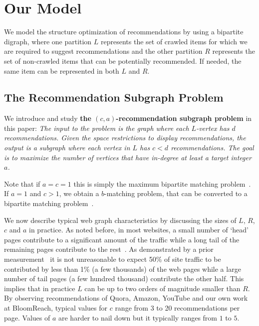\section{Our Model}

We model the structure optimization of recommendations by using a bipartite
digraph, where one partition $L$ represents the set of crawled items for which
we are required to suggest recommendations and the other partition $R$
represents the set of non-crawled items that can be potentially recommended. If
needed, the same item can be represented in both $L$ and $R$. 
\vs

\subsection{The Recommendation Subgraph Problem} 
We introduce and study {\bf the $(c, a)$-recommendation subgraph problem} in this paper:
{\em
 The input to the problem is the graph where each
$L$-vertex has $d$ recommendations. Given the space restrictions to
display recommendations, the output is a subgraph where each vertex in
$L$ has $c < d$ recommendations. The goal is to maximize the number of
vertices that have in-degree at least a target integer $a$.
} 

\vs

Note that if $a=c=1$ this is simply the maximum bipartite
matching problem~\cite{LovaszPlummer1986}. If $a=1$ and $c > 1$, we
obtain a $b$-matching problem, that can be converted to a bipartite
matching problem~\cite{Gabow1983}.\vs

We now describe typical web graph characteristics by discussing the sizes of $L$, $R$, $c$ and $a$ in practice. As noted before, in most websites, a small number of `head' pages contribute to a significant amount of the traffic while a long tail of the remaining pages contribute to the rest~\cite{HubermanAdamic1999,
  DuDemmerBrewer2006}. As demonstrated by a prior
measurement~\cite{KumarNorrisSun2009} it is not unreasonable to expect
50\% of site traffic to be contributed by less than 1\% (a few
thousands) of the web pages while a large number of tail pages (a few
hundred thousand) contribute the other half. This implies that in
practice $L$ can be up to two orders of magnitude smaller than $R$.
By observing recommendations of Quora, Amazon, YouTube and our own
work at BloomReach, typical values for $c$ range from 3 to 20 recommendations per
page. Values of $a$ are harder to nail down but it typically ranges
from $1$ to $5$. \vs

